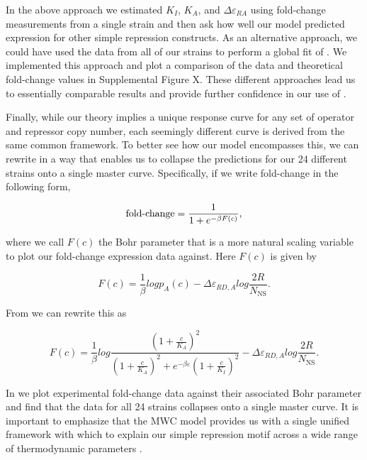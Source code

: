 In the above approach we estimated $K_I$, $K_A$, and $\Delta\varepsilon_{RA}$
using fold-change measurements from a single strain and then ask how well our
model predicted expression for other simple repression constructs. As an
alternative approach, we could have used the data from all of our strains to
perform a global fit of \eref[eq7]. We implemented this approach and plot a
comparison of the data and theoretical fold-change values in Supplemental Figure
X. These different approaches lead us to essentially comparable results and
provide further confidence in our use of \eref[eq7].

 Finally, while our theory implies a unique
response curve for any set of operator and repressor copy number, each seemingly
different curve is derived from the same common framework. To
better see how our model encompasses this, we can rewrite \eref[eq7] in a way
that enables us to collapse the predictions for our 24 different strains onto a
single master curve. Specifically, if we write fold-change in the following
form,

\begin{equation}\label{eq8}
\operatorname{fold-change}= \frac{1}{1+e^{-\beta F(c)}} ,
\end{equation}

\noindent where we call $F(c)$ the Bohr parameter \cite{Phillips2016} that is a more natural scaling variable to plot our fold-change expression data against. Here $F(c)$ is given by 


\begin{equation}\label{eq9}
F(c) =  \frac{1}{\beta} log p_A(c)
- \Delta\varepsilon_{RD,A}
log \frac{2R}{N_{\text{NS}}} .
\end{equation}

From \eref[eq6v2] we can rewrite this as

\begin{equation}\label{eq10}
F(c) = \frac{1}{\beta} log \frac{\left(1+\frac{c}{K_A}\right)^2}{\left(1+\frac{c}{K_A}\right)^2+e^{-\beta  \varepsilon }\left(1+\frac{c}{K_I}\right)^2} - \Delta\varepsilon_{RD,A} log \frac{2R}{N_{\text{NS}}} .
\end{equation}

In  we plot experimental fold-change data against their
associated Bohr parameter and find that the data for all 24 strains collapses onto a single master curve. It is important to emphasize that the MWC model provides us with a
single unified framework with which to explain our simple repression motif
across a wide range of thermodynamic parameters .

